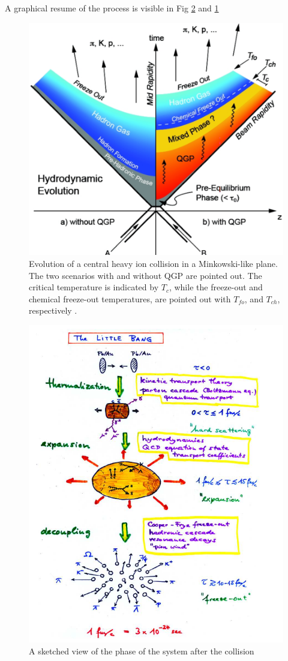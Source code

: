 \documentclass[12pt,a4paper]{book}
\begin{document}
	A graphical resume of the process is visible in Fig \ref{fig::collision_stage} and \ref{fig:collision_stage_mikowsky}
	\begin{figure}[ht]
		\centering
		\includegraphics[width=0.6\linewidth]{pictures/collision_stage_mikowsky.png}
		\caption{Evolution of a central heavy ion collision in a Minkowski-like plane. The two scenarios with and without QGP are pointed out. The critical temperature is indicated by $T_c$, while the freeze-out and chemical freeze-out temperatures, are pointed out with $T_{fo}$, and $T_{ch}$, respectively \cite{EvolutionofcollisionsandQGP}.}
		\label{fig:collision_stage_mikowsky} 
	\end{figure}
	
	\begin{figure}[ht]
		\centering
		\includegraphics[width=0.7\linewidth]{pictures/collision_stage.png}
		\caption{A sketched view of the phase of the system after the collision}
		\label{fig::collision_stage} 
	\end{figure}
	
\end{document}
